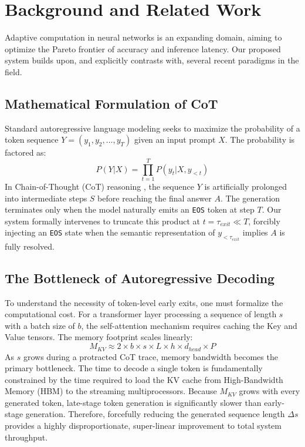 \documentclass[11pt]{article}
\begin{document}
\section{Background and Related Work}
Adaptive computation in neural networks is an expanding domain, aiming to optimize the Pareto frontier of accuracy and inference latency. Our proposed system builds upon, and explicitly contrasts with, several recent paradigms in the field.

\subsection{Mathematical Formulation of CoT}
Standard autoregressive language modeling seeks to maximize the probability of a token sequence $Y = (y_1, y_2, \dots, y_T)$ given an input prompt $X$. The probability is factored as:
\begin{equation}
    P(Y | X) = \prod_{t=1}^{T} P(y_t | X, y_{<t})
\end{equation}
In Chain-of-Thought (CoT) reasoning \cite{wei2022chainofthought}, the sequence $Y$ is artificially prolonged into intermediate steps $S$ before reaching the final answer $A$. The generation terminates only when the model naturally emits an \texttt{EOS} token at step $T$. Our system formally intervenes to truncate this product at $t = \tau_{exit} \ll T$, forcibly injecting an \texttt{EOS} state when the semantic representation of $y_{<\tau_{exit}}$ implies $A$ is fully resolved.


\subsection{The Bottleneck of Autoregressive Decoding}
To understand the necessity of token-level early exits, one must formalize the computational cost. For a transformer layer processing a sequence of length $s$ with a batch size of $b$, the self-attention mechanism requires caching the Key and Value tensors. The memory footprint scales linearly:
\begin{equation}
    M_{KV} \approx 2 \times b \times s \times L \times h \times d_{head} \times P
\end{equation}
As $s$ grows during a protracted CoT trace, memory bandwidth becomes the primary bottleneck. The time to decode a single token is fundamentally constrained by the time required to load the KV cache from High-Bandwidth Memory (HBM) to the streaming multiprocessors. Because $M_{KV}$ grows with every generated token, late-stage token generation is significantly slower than early-stage generation. Therefore, forcefully reducing the generated sequence length $\Delta s$ provides a highly disproportionate, super-linear improvement to total system throughput.
\end{document}
